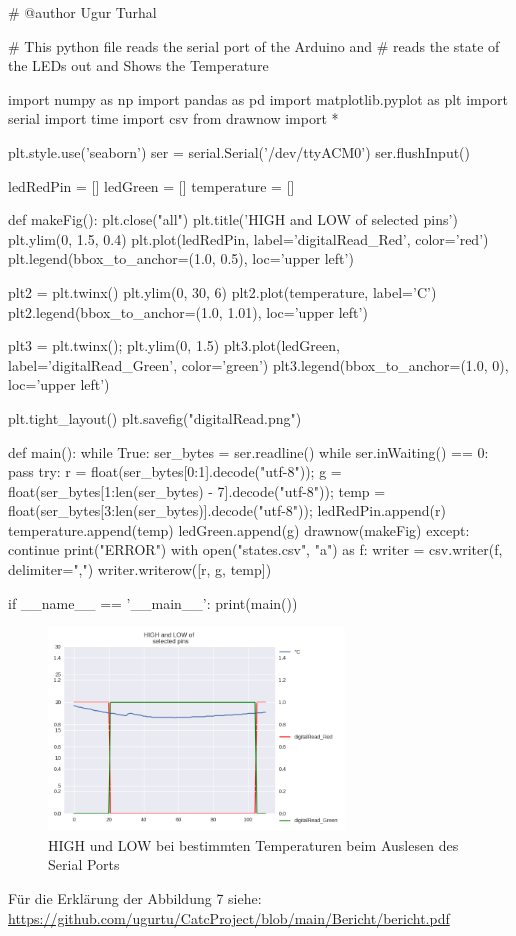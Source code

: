 \documentclass[12pt]{article}
\begin{document}
\begin{python}
# @author Ugur Turhal

# This python file reads the serial port of the Arduino and
# reads the state of the LEDs out and Shows the Temperature

import numpy as np
import pandas as pd
import matplotlib.pyplot as plt
import serial
import time
import csv
from drawnow import *

plt.style.use('seaborn')
ser = serial.Serial('/dev/ttyACM0')
ser.flushInput()

ledRedPin = []
ledGreen = []
temperature = []


def makeFig():
    plt.close("all")
    plt.title('HIGH and LOW of \n selected pins')
    plt.ylim(0, 1.5, 0.4)
    plt.plot(ledRedPin, label='digitalRead_Red', color='red')
    plt.legend(bbox_to_anchor=(1.0, 0.5), loc='upper left')

    plt2 = plt.twinx()
    plt.ylim(0, 30, 6)
    plt2.plot(temperature, label='C')
    plt2.legend(bbox_to_anchor=(1.0, 1.01), loc='upper left')

    plt3 = plt.twinx();
    plt.ylim(0, 1.5)
    plt3.plot(ledGreen, label='digitalRead_Green', color='green')
    plt3.legend(bbox_to_anchor=(1.0, 0), loc='upper left')

    plt.tight_layout()
    plt.savefig("digitalRead.png")


def main():
    while True:
        ser_bytes = ser.readline()
        while ser.inWaiting() == 0:
            pass
        try:
            r = float(ser_bytes[0:1].decode("utf-8"));
            g = float(ser_bytes[1:len(ser_bytes) - 7].decode("utf-8"));
            temp = float(ser_bytes[3:len(ser_bytes)].decode("utf-8"));
            ledRedPin.append(r)
            temperature.append(temp)
            ledGreen.append(g)
            drawnow(makeFig)
        except:
            continue
            print("ERROR")
        with open("states.csv", "a") as f:
            writer = csv.writer(f, delimiter=",")
            writer.writerow([r, g, temp])


if __name__ == '__main__':
    print(main())

\end{python}
\begin{figure}[H]
\begin{center}
\includegraphics[width=0.7\textwidth]{pics/digitalRead.png}
\caption{HIGH und LOW bei bestimmten Temperaturen beim Auslesen des Serial Ports}
\end{center}
\end{figure}
Für die Erklärung der Abbildung 7 siehe: \url{https://github.com/ugurtu/CatcProject/blob/main/Bericht/bericht.pdf}
\end{document}

